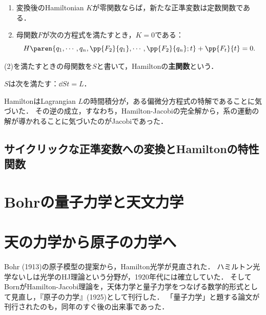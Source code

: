 \documentclass[uplatex,dvipdfmx]{jsreport}
\begin{document}
\begin{theorem}\mbox{}
    \begin{enumerate}
        \item 変換後のHamiltonian $K$が零関数ならば，新たな正準変数は定数関数である．
        \item 母関数$F$が次の方程式を満たすとき，$K=0$である：
        \[H\paren{q_1,\cdots,q_n,\pp{F_2}{q_1},\cdots,\pp{F_2}{q_n};t}+\pp{F_t}{t}=0.\]
    \end{enumerate}
    (2)を満たすときの母関数を$S$と書いて，Hamiltonの\textbf{主関数}という．
\end{theorem}

\begin{corollary}
    $S$は次を満たす：$\dd{S}{t}=L$．
\end{corollary}

\begin{history}
    HamiltonはLagrangian $L$の時間積分が，ある偏微分方程式の特解であることに気づいた．
    その逆の成立，すなわち，Hamilton-Jacobiの完全解から，系の運動の解が導かれることに気づいたのがJacobiであった．
\end{history}

\subsection{サイクリックな正準変数への変換とHamiltonの特性関数}

\section{Bohrの量子力学と天文力学}

\section{天の力学から原子の力学へ}

\begin{tcolorbox}[colframe=ForestGreen, colback=ForestGreen!10!white,breakable,colbacktitle=ForestGreen!40!white,coltitle=black,fonttitle=\bfseries\sffamily,
title=]
    Bohr (1913)の原子模型の提案から，Hamilton光学が見直された．
    ハミルトン光学ないしは光学のHJ理論という分野が，1920年代には確立していた．
    そしてBornがHamilton-Jacobi理論を，天体力学と量子力学をつなげる数学的形式として見直し，『原子の力学』(1925)として刊行した．
    「量子力学」と題する論文が刊行されたのも，同年のすぐ後の出来事であった．
\end{tcolorbox}
\end{document}
